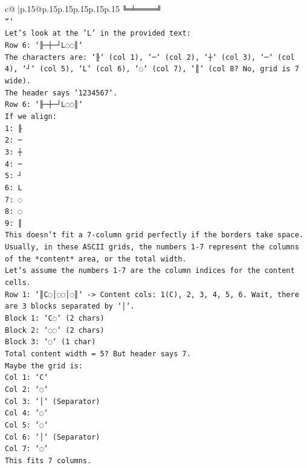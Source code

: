 \documentclass{article}
\begin{document}
{\begin{supertabular}{c@{$\;$}|p{.15\linewidth}@{}p{.15\linewidth}p{.15\linewidth}p{.15\linewidth}p{.15\linewidth}p{.15\linewidth}}
{{{\texttt{╚═╧═════╝} \\
\texttt{```} \\
\texttt{Let's look at the 'L' in the provided text:} \\
\texttt{Row 6: `╟─┼─┘L◌◌║`} \\
\texttt{The characters are: `╟` (col 1), `─` (col 2), `┼` (col 3), `─` (col 4), `┘` (col 5), `L` (col 6), `◌` (col 7), `║` (col 8? No, grid is 7 wide).} \\
\texttt{The header says `1234567`.} \\
\texttt{Row 6: `╟─┼─┘L◌◌║`} \\
\texttt{If we align:} \\
\texttt{1: ╟} \\
\texttt{2: ─} \\
\texttt{3: ┼} \\
\texttt{4: ─} \\
\texttt{5: ┘} \\
\texttt{6: L} \\
\texttt{7: ◌} \\
\texttt{8: ◌} \\
\texttt{9: ║} \\
\texttt{This doesn't fit a 7{-}column grid perfectly if the borders take space. Usually, in these ASCII grids, the numbers 1{-}7 represent the columns of the *content* area, or the total width.} \\
\texttt{Let's assume the numbers 1{-}7 are the column indices for the content cells.} \\
\texttt{Row 1: `║C◌│◌◌│◌║` {-}> Content cols: 1(C), 2, 3, 4, 5, 6. Wait, there are 3 blocks separated by `│`.} \\
\texttt{Block 1: `C◌` (2 chars)} \\
\texttt{Block 2: `◌◌` (2 chars)} \\
\texttt{Block 3: `◌` (1 char)} \\
\texttt{Total content width = 5? But header says 7.} \\
\texttt{Maybe the grid is:} \\
\texttt{Col 1: `C`} \\
\texttt{Col 2: `◌`} \\
\texttt{Col 3: `│` (Separator)} \\
\texttt{Col 4: `◌`} \\
\texttt{Col 5: `◌`} \\
\texttt{Col 6: `│` (Separator)} \\
\texttt{Col 7: `◌`} \\
\texttt{This fits 7 columns.} \\
}}}
\end{supertabular}}
\end{document}
